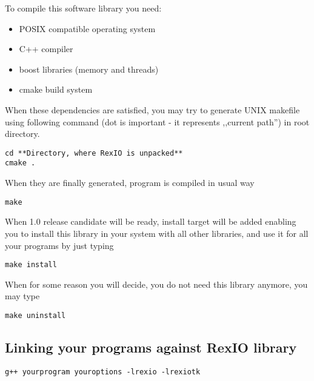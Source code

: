 To compile this software library you need:

\begin{itemize}
\item POSIX compatible operating system
\item C++ compiler
\item boost libraries (memory and threads)
\item cmake build system
\end{itemize}

When these dependencies are satisfied, you may try to generate UNIX
makefile using following command (dot is important - it represents
,,current path'') in root directory.
\begin{verbatim}
cd **Directory, where RexIO is unpacked**
cmake .
\end{verbatim}

When they are finally  generated, program is compiled in usual way

\begin{verbatim}
make
\end{verbatim}

When 1.0 release candidate will be ready, install target will be added
enabling you to install this library in your system with all other
libraries, and use it for all your programs by just typing

\begin{verbatim}
make install
\end{verbatim}

When for some reason you will decide, you do not need this library
anymore, you may type

\begin{verbatim}
make uninstall
\end{verbatim}


\subsection{Linking your programs against RexIO library}

\begin{verbatim}
g++ yourprogram youroptions -lrexio -lrexiotk
\end{verbatim}